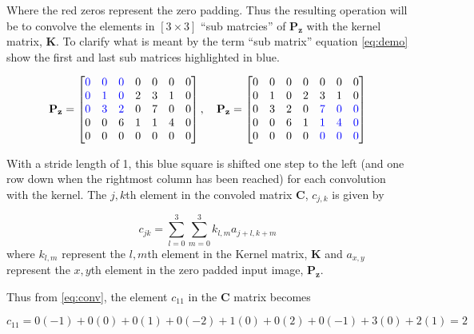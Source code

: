 \documentclass{article}
\begin{document}
Where the red zeros represent the zero padding. Thus the resulting operation will be to convolve the elements in $[3\times 3]$ ``sub matrcies'' of $\mathbf{P_z}$ with the kernel matrix, $\mathbf{K}$. To clarify what is meant by the term ``sub matrix'' equation \eqref{eq:demo} show the first and last sub matrices highlighted in blue. 

\begin{equation}\def\r{\color{red}}\def\b{\color{blue}}
    \mathbf{P_z} = \begin{bmatrix}
    \b0 &\b0&\b0&0&0&0&0 \\
     \b0&  \b1 & \b0& 2 & 3 & 1&0\\
      \b0&    \b3 & \b2& 0 & 7 & 0&0\\
      0&   0 & 6& 1 & 1 & 4&0 \\
      0&0&0&0&0&0&0\\
    \end{bmatrix}, \quad
    \mathbf{P_z} = \begin{bmatrix}
    0 &0&0&0&0&0&0 \\
     0&  1 & 0& 2 & 3 & 1&0\\
      0&    3 & 2& 0 &\b7 & \b0&\b0\\
      0&   0 & 6& 1 & \b1 & \b4&\b0 \\
      0&0&0&0&\b0&\b0&\b0\\
    \end{bmatrix}
    \label{eq:demo}
\end{equation}

With a stride length of 1, this blue square is shifted one step to the left (and one row down when the rightmost column has been reached) for each convolution with the kernel. The $j,k$th element in the convoled matrix $\mathbf{C}$, $c_{j,k}$ is given by

\begin{equation}
    c_{jk} = \sum_{l=0}^{3} \sum_{m=0}^{3} k_{l, m} a_{j+l, k+m} 
    \label{eq:conv}
\end{equation}
where $k_{l,m}$ represent the $l,m$th element in the Kernel matrix, $\mathbf{K}$ and $a_{x,y}$ represent the $x,y$th element in the zero padded input image, $\mathbf{P_z}$.


Thus from \eqref{eq:conv}, the element $c_{11}$ in the $\mathbf{C}$ matrix becomes

\begin{equation}
    c_{11} = 0(-1) + 0(0) + 0(1) + 0(-2) + 1(0) + 0(2) + 0(-1) + 3(0) + 2(1) = 2 
\end{equation}
\end{document}
